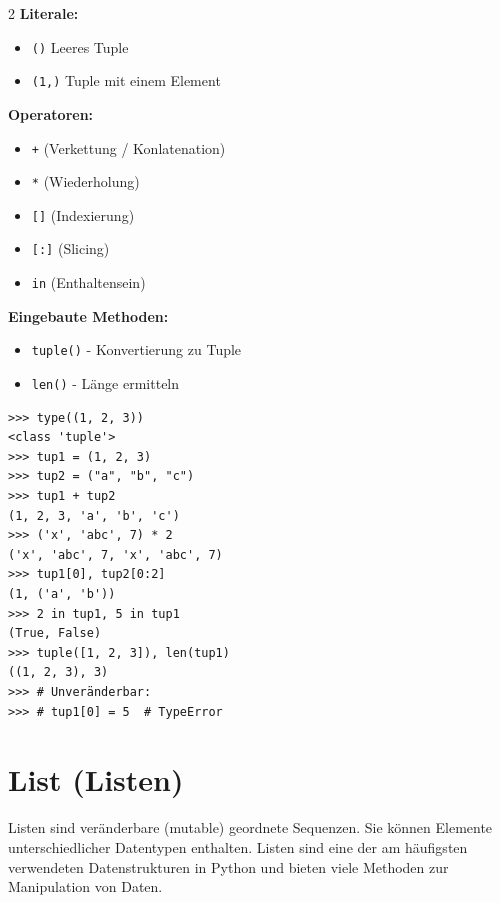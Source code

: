 \documentclass[ngerman,11pt]{article}
\begin{document}
\begin{multicols}{2}\raggedcolumns
\noindent\textbf{Literale:}
\begin{itemize}[leftmargin=*]
    \item \texttt{()} Leeres Tuple
    \item \texttt{(1,)} Tuple mit einem Element
\end{itemize}
\par\bigskip

\noindent\textbf{Operatoren:}
\begin{itemize}[leftmargin=*]
    \item \texttt{+} (Verkettung / Konlatenation)
    \item \texttt{*} (Wiederholung)
    \item \texttt{[]} (Indexierung)
    \item \texttt{[:]} (Slicing)
    \item \texttt{in} (Enthaltensein)
\end{itemize}
\par\bigskip

\noindent\textbf{Eingebaute Methoden:}
\begin{itemize}[leftmargin=*]
    \item \texttt{tuple()} - Konvertierung zu Tuple
    \item \texttt{len()} - Länge ermitteln
\end{itemize}
\columnbreak
\begin{lstlisting}
>>> type((1, 2, 3))
<class 'tuple'>
>>> tup1 = (1, 2, 3)
>>> tup2 = ("a", "b", "c")
>>> tup1 + tup2
(1, 2, 3, 'a', 'b', 'c')
>>> ('x', 'abc', 7) * 2
('x', 'abc', 7, 'x', 'abc', 7)
>>> tup1[0], tup2[0:2]
(1, ('a', 'b'))
>>> 2 in tup1, 5 in tup1
(True, False)
>>> tuple([1, 2, 3]), len(tup1)
((1, 2, 3), 3)
>>> # Unveränderbar:
>>> # tup1[0] = 5  # TypeError
\end{lstlisting}
\end{multicols}

\section{List (Listen)}

Listen sind veränderbare (mutable) geordnete Sequenzen. Sie können Elemente unterschiedlicher Datentypen enthalten. Listen sind eine der am häufigsten verwendeten Datenstrukturen in Python und bieten viele Methoden zur Manipulation von Daten.
\end{document}
